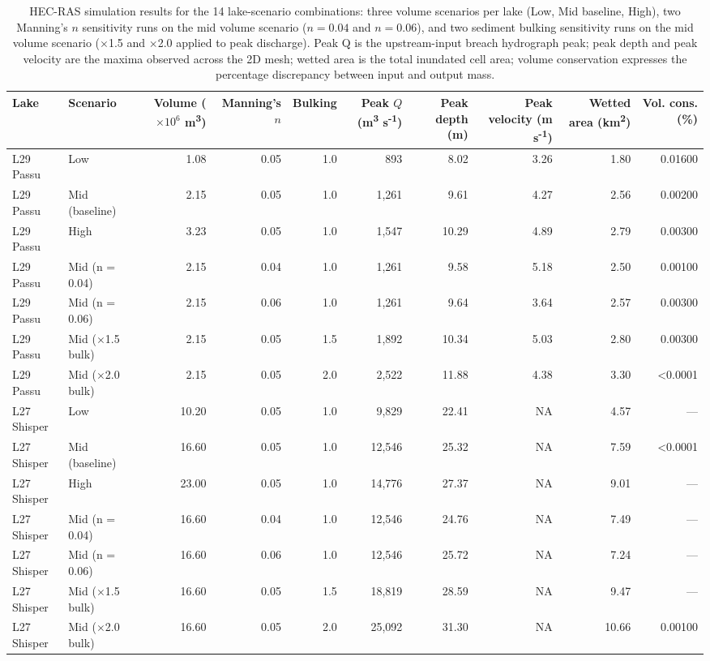 \begin{table}[ht]
\centering
\scriptsize
\caption{HEC-RAS simulation results for the 14 lake-scenario combinations: three volume scenarios per lake (Low, Mid baseline, High), two Manning's $n$ sensitivity runs on the mid volume scenario ($n = 0.04$ and $n = 0.06$), and two sediment bulking sensitivity runs on the mid volume scenario ($\times$1.5 and $\times$2.0 applied to peak discharge). Peak Q is the upstream-input breach hydrograph peak; peak depth and peak velocity are the maxima observed across the 2D mesh; wetted area is the total inundated cell area; volume conservation expresses the percentage discrepancy between input and output mass.}
\label{tab:simulation_results}
\begin{tabular}{llrrrrrrrr}
\hline
Lake & Scenario & Volume ($\times 10^6$ m\textsuperscript{3}) & Manning's $n$ & Bulking & Peak $Q$ (m\textsuperscript{3} s\textsuperscript{-1}) & Peak depth (m) & Peak velocity (m s\textsuperscript{-1}) & Wetted area (km\textsuperscript{2}) & Vol. cons. (\%) \\
\hline
L29 Passu & Low & 1.08 & 0.05 & 1.0 & 893 & 8.02 & 3.26 & 1.80 & 0.01600 \\
L29 Passu & Mid (baseline) & 2.15 & 0.05 & 1.0 & 1,261 & 9.61 & 4.27 & 2.56 & 0.00200 \\
L29 Passu & High & 3.23 & 0.05 & 1.0 & 1,547 & 10.29 & 4.89 & 2.79 & 0.00300 \\
L29 Passu & Mid (n = 0.04) & 2.15 & 0.04 & 1.0 & 1,261 & 9.58 & 5.18 & 2.50 & 0.00100 \\
L29 Passu & Mid (n = 0.06) & 2.15 & 0.06 & 1.0 & 1,261 & 9.64 & 3.64 & 2.57 & 0.00300 \\
L29 Passu & Mid ($\times$1.5 bulk) & 2.15 & 0.05 & 1.5 & 1,892 & 10.34 & 5.03 & 2.80 & 0.00300 \\
L29 Passu & Mid ($\times$2.0 bulk) & 2.15 & 0.05 & 2.0 & 2,522 & 11.88 & 4.38 & 3.30 & <0.0001 \\
L27 Shisper & Low & 10.20 & 0.05 & 1.0 & 9,829 & 22.41 &  NA & 4.57 & — \\
L27 Shisper & Mid (baseline) & 16.60 & 0.05 & 1.0 & 12,546 & 25.32 &  NA & 7.59 & <0.0001 \\
L27 Shisper & High & 23.00 & 0.05 & 1.0 & 14,776 & 27.37 &  NA & 9.01 & — \\
L27 Shisper & Mid (n = 0.04) & 16.60 & 0.04 & 1.0 & 12,546 & 24.76 &  NA & 7.49 & — \\
L27 Shisper & Mid (n = 0.06) & 16.60 & 0.06 & 1.0 & 12,546 & 25.72 &  NA & 7.24 & — \\
L27 Shisper & Mid ($\times$1.5 bulk) & 16.60 & 0.05 & 1.5 & 18,819 & 28.59 &  NA & 9.47 & — \\
L27 Shisper & Mid ($\times$2.0 bulk) & 16.60 & 0.05 & 2.0 & 25,092 & 31.30 &  NA & 10.66 & 0.00100 \\
\hline
\end{tabular}
\end{table}
